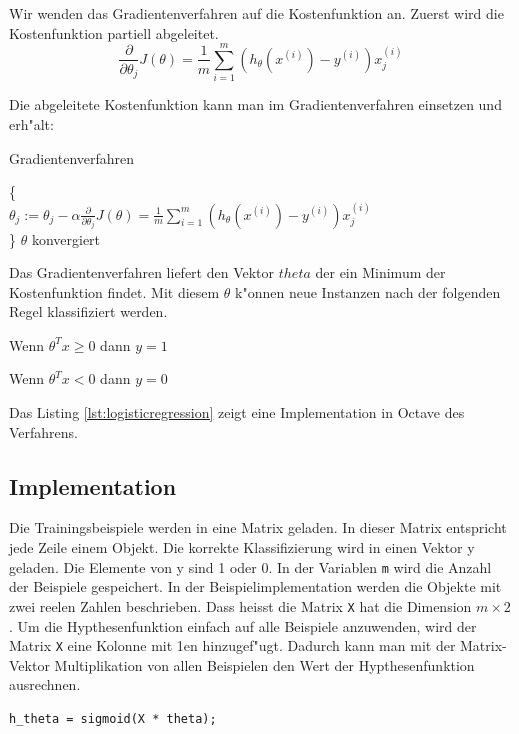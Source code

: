\documentclass[12pt,a4paper,twoside]{article}
\begin{document}
Wir wenden das Gradientenverfahren auf die Kostenfunktion an. Zuerst wird die Kostenfunktion partiell abgeleitet.
\begin{equation}
  \label{eq:costderivativ}
  \frac{\partial}{\partial \theta_j} J(\theta) = \frac{1}{m} \sum_{i=1}^m (h_{\theta} (x^{(i)}) - y^{(i)})x_j^{(i)}
\end{equation}

Die abgeleitete Kostenfunktion kann man im Gradientenverfahren einsetzen und erh"alt:
\begin{algorithm}
\caption{Gradientenverfahren}
\begin{algorithmic}

\Repeat \{ \\
$\theta_j := \theta_j - \alpha \frac{\partial}{\partial \theta_j} J(\theta) = \frac{1}{m} \sum_{i=1}^m (h_{\theta} (x^{(i)}) - y^{(i)})x_j^{(i)}$  \\
\}
\Until $\theta$ konvergiert 

 \end{algorithmic}  
\end{algorithm}

Das Gradientenverfahren liefert den Vektor $theta$ der ein Minimum der Kostenfunktion findet. Mit diesem $\theta$ k"onnen neue Instanzen nach der folgenden Regel klassifiziert werden.

Wenn $\theta^T x \geq 0$ dann $y=1$

Wenn $\theta^T x < 0$ dann $y=0$

Das Listing \ref{lst:logisticregression} zeigt eine Implementation in Octave des Verfahrens.

\subsection{Implementation}
\label{sec:implementation}
Die Trainingsbeispiele werden in eine Matrix geladen. In dieser Matrix entspricht jede Zeile einem Objekt. Die korrekte Klassifizierung wird in einen Vektor y geladen. Die Elemente von y sind 1 oder 0. In der Variablen \verb|m| wird die Anzahl der Beispiele gespeichert. In der Beispielimplementation werden die Objekte mit zwei reelen Zahlen beschrieben. Dass heisst die Matrix \verb|X| hat die Dimension $m \times 2$. Um die Hypthesenfunktion einfach auf alle Beispiele anzuwenden, wird der Matrix \verb|X| eine Kolonne mit 1en hinzugef"ugt. Dadurch kann man mit der Matrix-Vektor Multiplikation von allen Beispielen den Wert der Hypthesenfunktion ausrechnen.

\begin{lstlisting}
h_theta = sigmoid(X * theta);
\end{lstlisting}
\end{document}
